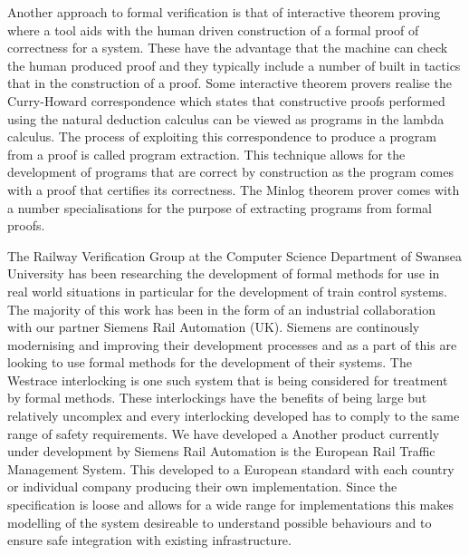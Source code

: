 Another approach to formal verification is that of interactive theorem proving where a tool aids with the human driven construction of a formal proof of correctness for a system. These have the advantage that the machine can check the human produced proof and they typically include a number of built in tactics that in the construction of a proof. Some interactive theorem provers realise the Curry-Howard correspondence \cite{HC34, HC58, WH80} which states that constructive proofs performed using the natural deduction calculus can be viewed as programs in the lambda calculus.  The process of exploiting this correspondence to produce a program from a proof is called program extraction. This technique allows for the development of programs that are correct by construction as the program comes with a proof that certifies its correctness. The Minlog theorem prover comes with a number specialisations for the purpose of extracting programs from formal proofs.
\begin{comment}
\textbf{Note: Add something about program extraction here.}
Alternatively to automatic techniques for verification there are also interactive theorem provers which employ man-machine collaboration in order to prove properties over a system.
Program extraction is another verification technique which allows the production of correct by construction computer programs. It is based around the Curry-Howard correspondence \cite{} which states that constructive proofs performed using the natural deduction calculus can be viewed as programs in the lambda calculus. 
\end{comment}


The Railway Verification Group at the Computer Science Department of Swansea University has been researching the development of formal methods for use in real world situations in particular for the development of train control systems. The majority of this work has been in the form of an industrial collaboration with our partner Siemens Rail Automation (UK). Siemens are continously modernising and improving their development processes and as a part of this are looking to use formal methods for the development of their systems. The Westrace interlocking is one such system that is being considered for treatment by formal methods. These interlockings have the benefits of being large but relatively uncomplex and every interlocking developed has to comply to the same range of safety requirements.  We have developed a Another product currently under development by Siemens Rail Automation is the European Rail Traffic Management System. This developed to a European  standard with each country or individual company producing their own implementation. Since the specification is loose and allows for a wide range for implementations this makes modelling of the system desireable to understand possible behaviours and to ensure safe integration with existing infrastructure.





